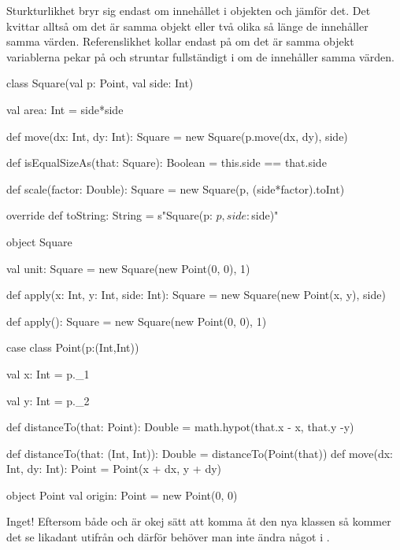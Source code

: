 \Subtask Sturkturlikhet bryr sig endast om innehållet i objekten och jämför det. Det kvittar alltså om det är samma objekt eller två olika så länge de innehåller samma värden. Referenslikhet kollar endast på om det är samma objekt variablerna pekar på och struntar fullständigt i om de innehåller samma värden.

\Task \begin{CodeSmall}
class Square(val p: Point, val side: Int) {
	val area: Int = side*side
	
	def move(dx: Int, dy: Int): Square = new Square(p.move(dx, dy), side)
	
	def isEqualSizeAs(that: Square): Boolean = this.side == that.side
	
	def scale(factor: Double): Square = new Square(p, (side*factor).toInt)
	
	override def toString: String = s"Square(p: $p, side: $side)"
}

object Square {
	val unit: Square = new Square(new Point(0, 0), 1)
	
	def apply(x: Int, y: Int, side: Int): Square = 
		new Square(new Point(x, y), side)
	
	def apply(): Square = new Square(new Point(0, 0), 1)
}
\end{CodeSmall}

\Task  \begin{CodeSmall}
case class Point(p:(Int,Int)) {
	val x: Int = p._1
	
	val y: Int = p._2
	
	def distanceTo(that: Point): Double = math.hypot(that.x - x, that.y -y)
		
	def distanceTo(that: (Int, Int)): Double = distanceTo(Point(that))
	def move(dx: Int, dy: Int): Point = Point(x + dx, y + dy)
}

object Point {
	val origin: Point = new Point(0, 0)
}
\end{CodeSmall}

\Task Inget! Eftersom både  och  är okej sätt att komma åt den nya klassen så kommer det se likadant utifrån och därför behöver man inte ändra något i . 

\Task %

